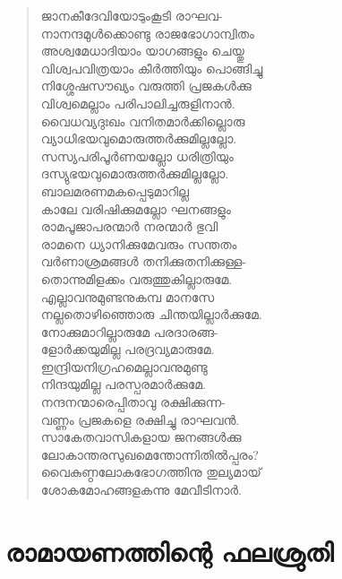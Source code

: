 \begin{verse}
ജാനകീദേവിയോടുംകൂടി രാഘവ-\\
നാനന്ദമുള്‍ക്കൊണ്ടു രാജഭോഗാന്വിതം\\
അശ്വമേധാദിയാം യാഗങ്ങളും ചെയ്തു\\
വിശ്വപവിത്രയാം കീര്‍ത്തിയും പൊങ്ങിച്ചു\\
നിശ്ശേഷസൗഖ്യം വരുത്തി പ്രജകള്‍ക്കു\\
വിശ്വമെല്ലാം പരിപാലിച്ചരുളിനാന്‍.\\
വൈധവ്യദുഃഖം വനിതമാര്‍ക്കില്ലൊരു\\
വ്യാധിഭയവുമൊരുത്തര്‍ക്കുമില്ലല്ലോ.\\
സസ്യപരിപൂര്‍ണയല്ലോ ധരിത്രിയും\\
ദസ്യുഭയവുമൊരുത്തര്‍ക്കുമില്ലല്ലോ.\\
ബാലമരണമകപ്പെടുമാറില്ല\\
കാലേ വരിഷിക്കുമല്ലോ ഘനങ്ങളും\\
രാമപൂജാപരന്മാര്‍ നരന്മാര്‍ ഭുവി\\
രാമനെ ധ്യാനിക്കുമേവരും സന്തതം\\
വര്‍ണാശ്രമങ്ങള്‍ തനിക്കുതനിക്കുള്ള-\\
തൊന്നുമിളക്കം വരുത്തുകില്ലാരുമേ.\\
എല്ലാവനുമുണ്ടനുകമ്പ മാനസേ\\
നല്ലതൊഴിഞ്ഞൊരു ചിന്തയില്ലാര്‍ക്കുമേ.\\
നോക്കുമാറില്ലാരുമേ പരദാരങ്ങ-\\
ളോര്‍ക്കയുമില്ല പരദ്രവ്യമാരുമേ.\\
ഇന്ദ്രിയനിഗ്രഹമെല്ലാവനുമുണ്ടു\\
നിന്ദയുമില്ല പരസ്പരമാര്‍ക്കുമേ.\\
നന്ദനന്മാരെപ്പിതാവു രക്ഷിക്കുന്ന-\\
വണ്ണം പ്രജകളെ രക്ഷിച്ചു രാഘവന്‍.\\
സാകേതവാസികളായ ജനങ്ങള്‍ക്കു\\
ലോകാന്തരസുഖമെന്തോന്നിതില്‍പ്പരം?\\
വൈകുണ്ഠലോകഭോഗത്തിനു തുല്യമായ്\\
ശോകമോഹങ്ങളകന്നു മേവീടിനാര്‍.
\end{verse}


\section{രാമായണത്തിന്റെ ഫലശ്രുതി}

